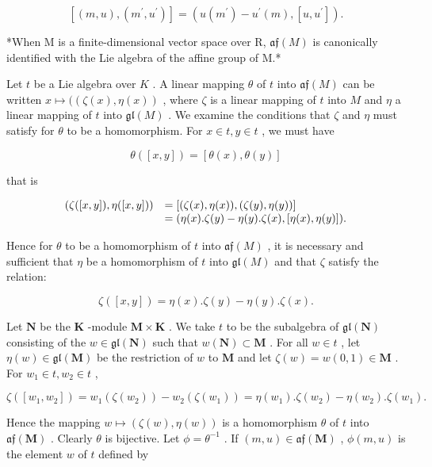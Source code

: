 \[
[ (m, u), (m ^ {\prime}, u ^ {\prime}) ] = (u (m ^ {\prime}) - u ^ {\prime} (m), [ u, u ^ {\prime} ]).
\]

*When M is a finite-dimensional vector space over R, \(\mathfrak{af}(M)\) is canonically identified with the Lie algebra of the affine group of M.*

Let \(t\) be a Lie algebra over \(K\) . A linear mapping \(\theta\) of \(t\) into \(\mathfrak{af}(M)\) can be written \(x \mapsto ((\zeta(x), \eta(x))\) , where \(\zeta\) is a linear mapping of \(t\) into \(M\) and \(\eta\) a linear mapping of \(t\) into \(\mathfrak{gl}(M)\) . We examine the conditions that \(\zeta\) and \(\eta\) must satisfy for \(\theta\) to be a homomorphism. For \(x \in t, y \in t\) , we must have

\[
\theta ([ x, y ]) = [ \theta (x), \theta (y) ]
\]

that is

\[
\begin{array}{r l} (\zeta ([ x, y ]), \eta ([ x, y ])) & = [ (\zeta (x), \eta (x)), (\zeta (y), \eta (y)) ] \\ & = (\eta (x). \zeta (y) - \eta (y). \zeta (x), [ \eta (x), \eta (y) ]). \end{array}
\]

Hence for \(\theta\) to be a homomorphism of \(t\) into \(\mathfrak{af}(M)\) , it is necessary and sufficient that \(\eta\) be a homomorphism of \(t\) into \(\mathfrak{gl}(M)\) and that \(\zeta\) satisfy the relation:

\[
\zeta ([ x, y ]) = \eta (x). \zeta (y) - \eta (y). \zeta (x).\tag{13}
\]

Let \(\mathbf{N}\) be the \(\mathbf{K}\) -module \(\mathbf{M} \times \mathbf{K}\) . We take \(t\) to be the subalgebra of \(\mathfrak{gl}(\mathbf{N})\) consisting of the \(w \in \mathfrak{gl}(\mathbf{N})\) such that \(w(\mathbf{N}) \subset \mathbf{M}\) . For all \(w \in t\) , let \(\eta(w) \in \mathfrak{gl}(\mathbf{M})\) be the restriction of \(w\) to \(\mathbf{M}\) and let \(\zeta(w) = w(0,1) \in \mathbf{M}\) . For \(w_1 \in t, w_2 \in t\) ,

\[
\zeta ([ w _ {1}, w _ {2} ]) = w _ {1} (\zeta (w _ {2})) - w _ {2} (\zeta (w _ {1})) = \eta (w _ {1}). \zeta (w _ {2}) - \eta (w _ {2}). \zeta (w _ {1}).
\]

Hence the mapping \(w \mapsto (\zeta(w), \eta(w))\) is a homomorphism \(\theta\) of \(t\) into \(\mathfrak{af}(\mathbf{M})\) . Clearly \(\theta\) is bijective. Let \(\phi = \theta^{-1}\) . If \((m, u) \in \mathfrak{af}(\mathbf{M})\) , \(\phi(m, u)\) is the element \(w\) of \(t\) defined by

